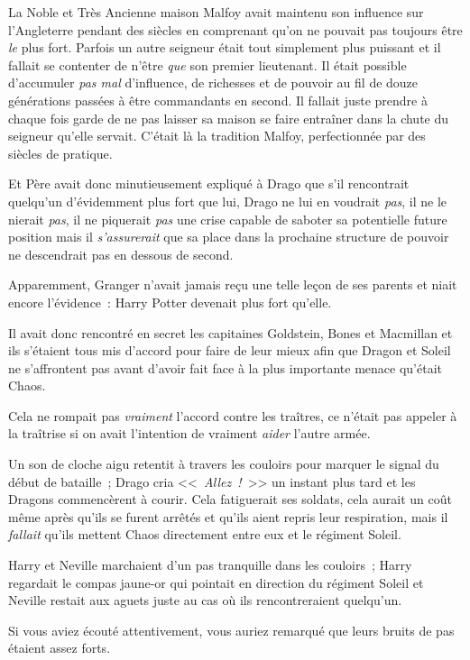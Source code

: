 La Noble et Très Ancienne maison Malfoy avait maintenu son influence sur l'Angleterre pendant des siècles en comprenant qu'on ne pouvait pas toujours être \emph{le} plus fort. Parfois un autre seigneur était tout simplement plus puissant et il fallait se contenter de n'être \emph{que} son premier lieutenant. Il était possible d'accumuler \emph{pas mal} d'influence, de richesses et de pouvoir au fil de douze générations passées à être commandants en second. Il fallait juste prendre à chaque fois garde de ne pas laisser sa maison se faire entraîner dans la chute du seigneur qu'elle servait. C'était là la tradition Malfoy, perfectionnée par des siècles de pratique.

Et Père avait donc minutieusement expliqué à Drago que s'il rencontrait quelqu'un d'évidemment plus fort que lui, Drago ne lui en voudrait \emph{pas}, il ne le nierait \emph{pas}, il ne piquerait \emph{pas} une crise capable de saboter sa potentielle future position mais il \emph{s'assurerait} que sa place dans la prochaine structure de pouvoir ne descendrait pas en dessous de second.

Apparemment, Granger n'avait jamais reçu une telle leçon de ses parents et niait encore l'évidence~: Harry Potter devenait plus fort qu'elle.

Il avait donc rencontré en secret les capitaines Goldstein, Bones et Macmillan et ils s'étaient tous mis d'accord pour faire de leur mieux afin que Dragon et Soleil ne s'affrontent pas avant d'avoir fait face à la plus importante menace qu'était Chaos.

Cela ne rompait pas \emph{vraiment} l'accord contre les traîtres, ce n'était pas appeler à la traîtrise si on avait l'intention de vraiment \emph{aider} l'autre armée.

Un son de cloche aigu retentit à travers les couloirs pour marquer le signal du début de bataille~; Drago cria <<~\emph{Allez~!}~>> un instant plus tard et les Dragons commencèrent à courir. Cela fatiguerait ses soldats, cela aurait un coût même après qu'ils se furent arrêtés et qu'ils aient repris leur respiration, mais il \emph{fallait} qu'ils mettent Chaos directement entre eux et le régiment Soleil.

\later

Harry et Neville marchaient d'un pas tranquille dans les couloirs~; Harry regardait le compas jaune-or qui pointait en direction du régiment Soleil et Neville restait aux aguets juste au cas où ils rencontreraient quelqu'un.

Si vous aviez écouté attentivement, vous auriez remarqué que leurs bruits de pas étaient assez forts.


